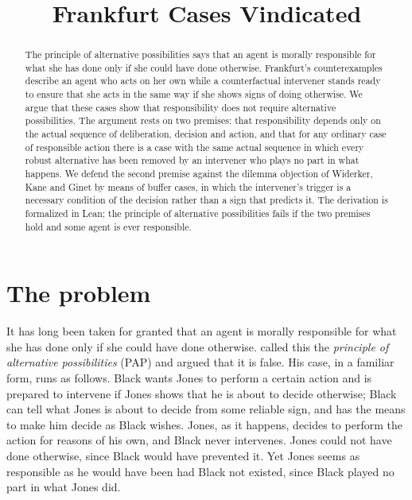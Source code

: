 \documentclass{situationist-preprint}
\title{Frankfurt Cases Vindicated}
\begin{document}
\maketitle

\begin{abstract}
The principle of alternative possibilities says that an agent is morally responsible for what she has done only if she could have done otherwise. Frankfurt's counterexamples describe an agent who acts on her own while a counterfactual intervener stands ready to ensure that she acts in the same way if she shows signs of doing otherwise. We argue that these cases show that responsibility does not require alternative possibilities. The argument rests on two premises: that responsibility depends only on the actual sequence of deliberation, decision and action, and that for any ordinary case of responsible action there is a case with the same actual sequence in which every robust alternative has been removed by an intervener who plays no part in what happens. We defend the second premise against the dilemma objection of Widerker, Kane and Ginet by means of buffer cases, in which the intervener's trigger is a necessary condition of the decision rather than a sign that predicts it. The derivation is formalized in Lean; the principle of alternative possibilities fails if the two premises hold and some agent is ever responsible.
\end{abstract}

\section{The problem}

It has long been taken for granted that an agent is morally responsible for what she has done only if she could have done otherwise. \citet{Frankfurt1969} called this the \emph{principle of alternative possibilities} (PAP) and argued that it is false. His case, in a familiar form, runs as follows. Black wants Jones to perform a certain action and is prepared to intervene if Jones shows that he is about to decide otherwise; Black can tell what Jones is about to decide from some reliable sign, and has the means to make him decide as Black wishes. Jones, as it happens, decides to perform the action for reasons of his own, and Black never intervenes. Jones could not have done otherwise, since Black would have prevented it. Yet Jones seems as responsible as he would have been had Black not existed, since Black played no part in what Jones did.
\end{document}
